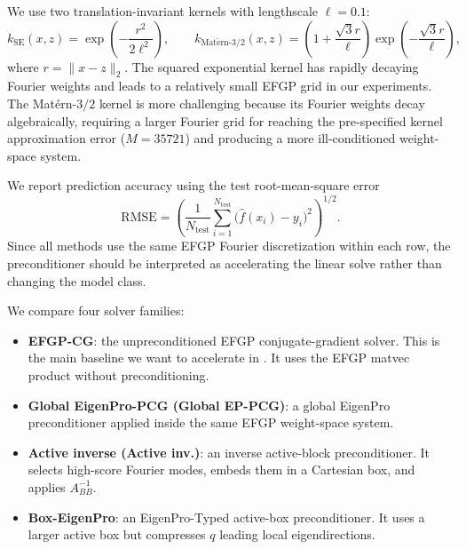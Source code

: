 We use two translation-invariant kernels with lengthscale \(\ell=0.1\):
\begin{equation}
k_{\mathrm{SE}}(x,z)
=
\exp\left(-\frac{r^2}{2\ell^2}\right),
\qquad
k_{\mathrm{Mat\acute{e}rn}\text{-}3/2}(x,z)
=
\left(1+\frac{\sqrt{3}r}{\ell}\right)
\exp\left(-\frac{\sqrt{3}r}{\ell}\right),
\label{eq:experiment-kernels}
\end{equation}
where \(r=\|x-z\|_2\). The squared exponential kernel has rapidly decaying Fourier weights and leads to a relatively small EFGP grid in our experiments. The Mat\'ern-\(3/2\) kernel is more challenging because its Fourier weights decay algebraically, requiring a larger Fourier grid for reaching the pre-specified kernel approximation error (\(M=35721\)) and producing a more ill-conditioned weight-space system\cite{greengard2025efgp,barnett2024uniform}.

We report prediction accuracy using the test root-mean-square error
\begin{equation}
    \mathrm{RMSE}
    =
    \left(
    \frac{1}{N_{\mathrm{test}}}
    \sum_{i=1}^{N_{\mathrm{test}}}
    \bigl(\widehat f(x_i)-y_i\bigr)^2
    \right)^{1/2}.
    \label{eq:rmse}
\end{equation}
Since all methods use the same EFGP Fourier discretization within each row, the preconditioner should be interpreted as accelerating the linear solve rather than changing the model class.

We compare four solver families:
\begin{itemize}
    \item \textbf{EFGP-CG}: the unpreconditioned EFGP conjugate-gradient solver. This is the main baseline we want to accelerate in \cite{greengard2025efgp,barnett2024uniform}. It uses the EFGP matvec product without preconditioning.

    \item \textbf{Global EigenPro-PCG (Global EP-PCG)}: a global EigenPro preconditioner applied inside the same EFGP weight-space system.

    \item \textbf{Active inverse (Active inv.)}: an inverse active-block preconditioner. It selects high-score Fourier modes, embeds them in a Cartesian box, and applies \(A_{BB}^{-1}\).

    \item \textbf{Box-EigenPro}: an EigenPro-Typed active-box preconditioner. It uses a larger active box but compresses \(q\) leading local eigendirections.
\end{itemize}

